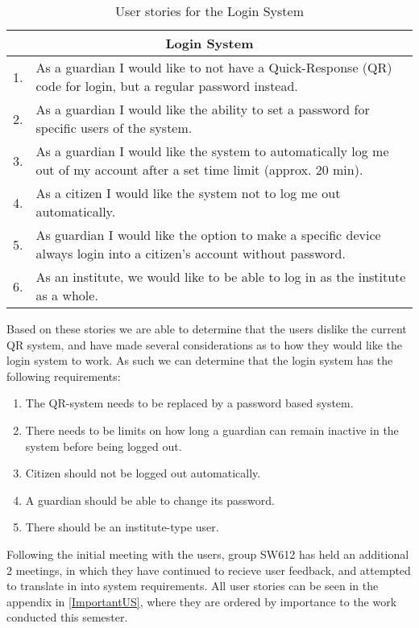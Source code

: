 \begin{table}[H]
\begin{tabular}{|c|p{12.5cm}|}
\hline 
\multicolumn{2}{|c|}{Login System}\\ \hline 
1. & As a guardian I would like to not have a Quick-Response (QR) code for
login, but a regular password instead.\\ \hline 
2. & As a guardian I would like the ability to set a password for specific users
of the system.\\ \hline
3. & As a guardian I would like the system to automatically log me out of my
account after a set time limit (approx. 20 min).\\ \hline
4. & As a citizen I would like the system not to log me out automatically.\\ \hline
5. & As guardian I would like the option to make a specific device always login
into a citizen's account without password.\\ \hline
6. & As an institute, we would like to be able to log in as the institute as a
whole.\\\hline
\end{tabular}
\caption{User stories for the Login System}
\label{UserStoriesLogin}
\end{table}
 
Based on these stories we are able to determine that the users dislike the
current QR system, and have made several considerations as to how they would
like the login system to work. As such we can determine that the login system
has the following requirements:

\begin{enumerate}
   \item The QR-system needs to be replaced by a password based system.
   \item There needs to be limits on how long a guardian can remain inactive in
   the system before being logged out.
   \item Citizen should not be logged out automatically. 
   \item A guardian should be able to change its password.
   \item There should be an institute-type user.
\end{enumerate}

Following the initial meeting with the users, group SW612 has held an additional
2 meetings, in which they have continued to recieve user feedback, and attempted
to translate in into system requirements. All user stories can be seen in the
appendix in \autoref{ImportantUS}, where they are ordered by importance to the
work conducted this semester.












